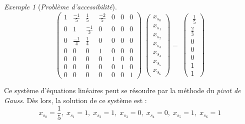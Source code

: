 \documentclass[12pt,a4paper]{report}
\theoremstyle{definition}
\theoremstyle{remark}
\newtheorem{example}{Exemple}[chapter]
\begin{document}
\begin{example}[\textit{Problème d'accessibilité}]
\[
\begin{pmatrix}
1 & \frac{-1}{5} & \frac{1}{5} & \frac{-2}{5} & 0 & 0 & 0 \\[0.3em]
0 & 1 & \frac{-1}{3} & 0 & 0 & 0 & 0 \\[0.3em]
0 & \frac{-1}{4} & \frac{1}{4} & 0 & 0 & 0 & 0 \\[0.3em]
0 & 0 & 0 & 1 & 0 & 0 & 0 \\[0.3em]
0 & 0 & 0 & 0 & 1 & 0 & 0 \\[0.3em]
0 & 0 & 0 & 0 & 0 & 1 & 0 \\[0.3em]
0 & 0 & 0 & 0 & 0 & 0 & 1
\end{pmatrix}
\;
\begin{pmatrix}
x_{s_0} \\[0.3em] x _{s_1} \\[0.3em] x_{s_2} \\[0.3em] x_{s_3} \\[0.3em] x_{s_4} \\[0.3em] x_{s_5} \\[0.3em] x_{s_6}
\end{pmatrix}
 = \;
\begin{pmatrix}
\; \frac{1}{5} \\[0.3em] \frac{2}{3} \\[0.3em] 0 \\[0.3em] 0 \\[0.3em] 0 \\[0.3em] 1 \\[0.3em] 1
\end{pmatrix}
\]

Ce système d'équations linéaires peut se résoudre par la méthode du \textit{pivot de Gauss}. %
Dès lors, la solution de ce système est :
\[
	x_{s_0} = \frac{1}{5}, \; x_{s_1} = 1, \; x_{s_2} = 1, \; x_{s_3} = 0, \; x_{s_4} = 0, \; x_{s_5} = 1, \; x_{s_6} = 1
\]
\end{example}
\end{document}
